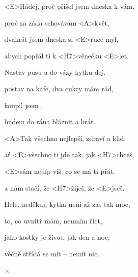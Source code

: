 

\zs
<E>Hádej, proč přišel jsem dneska k vám,

proč za záda schovávám <A>květ,

dvakrát jsem dneska si <E>ruce myl,

abych popřál ti k <H7>věnečku <E>let.
\ks

\zs
Nastav pusu a do vázy kytku dej,

postav na kafe, dva cukry mám rád,

koupil jsem ,

budem do rána bláznit a hrát.
\ks

\zr
<A>Tak všechno nejlepší, zdraví a klid,

ať <E>všechno ti jde tak, jak <H7>chceš,

<E>sám nejlíp víš, co se má ti přát,

a nám stačí, že <H7>žiješ, že <E>jseš.
\kr

\zs
Hele, neděkuj, kytka není až zas tak moc,

to, co uvnitř mám, neumím říct,

jako kostky je život, jak den a noc,

věčně střídá se mít -- nemít nic.
\ks

× \kr

\kp

